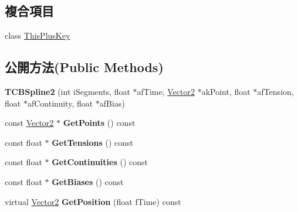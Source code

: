 \subsection*{複合項目}
\begin{DoxyCompactItemize}
\item 
class \hyperlink{class_magnum_1_1_t_c_b_spline2_1_1_this_plus_key}{This\+Plus\+Key}
\end{DoxyCompactItemize}
\subsection*{公開方法(Public Methods)}
\begin{DoxyCompactItemize}
\item 
{\bfseries T\+C\+B\+Spline2} (int i\+Segments, float $\ast$af\+Time, \hyperlink{class_magnum_1_1_vector2}{Vector2} $\ast$ak\+Point, float $\ast$af\+Tension, float $\ast$af\+Continuity, float $\ast$af\+Bias)\hypertarget{class_magnum_1_1_t_c_b_spline2_ae04cec2efa6101dc4d37141607da7d62}{}\label{class_magnum_1_1_t_c_b_spline2_ae04cec2efa6101dc4d37141607da7d62}

\item 
const \hyperlink{class_magnum_1_1_vector2}{Vector2} $\ast$ {\bfseries Get\+Points} () const \hypertarget{class_magnum_1_1_t_c_b_spline2_a10428f79da13f976367bb8581b4eb277}{}\label{class_magnum_1_1_t_c_b_spline2_a10428f79da13f976367bb8581b4eb277}

\item 
const float $\ast$ {\bfseries Get\+Tensions} () const \hypertarget{class_magnum_1_1_t_c_b_spline2_ac79cc6c0e7716613a647aa545a53f6dc}{}\label{class_magnum_1_1_t_c_b_spline2_ac79cc6c0e7716613a647aa545a53f6dc}

\item 
const float $\ast$ {\bfseries Get\+Continuities} () const \hypertarget{class_magnum_1_1_t_c_b_spline2_a508d720145ff9ba56506574f8337de48}{}\label{class_magnum_1_1_t_c_b_spline2_a508d720145ff9ba56506574f8337de48}

\item 
const float $\ast$ {\bfseries Get\+Biases} () const \hypertarget{class_magnum_1_1_t_c_b_spline2_a4f63cb4c7c9cc46fc69d97107d29cba6}{}\label{class_magnum_1_1_t_c_b_spline2_a4f63cb4c7c9cc46fc69d97107d29cba6}

\item 
virtual \hyperlink{class_magnum_1_1_vector2}{Vector2} {\bfseries Get\+Position} (float f\+Time) const \hypertarget{class_magnum_1_1_t_c_b_spline2_a0dea11bc477ebff50e22e72974588418}{}\label{class_magnum_1_1_t_c_b_spline2_a0dea11bc477ebff50e22e72974588418}


\end{DoxyCompactItemize}
